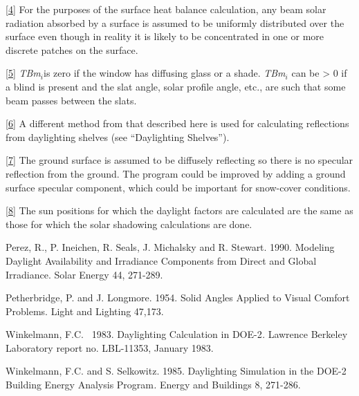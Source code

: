 \protect\hyperlink{ux5fftnref4}{{[}4{]}} For the purposes of the surface heat balance calculation, any beam solar radiation absorbed by a surface is assumed to be uniformly distributed over the surface even though in reality it is likely to be concentrated in one or more discrete patches on the surface.

\protect\hyperlink{ux5fftnref5}{{[}5{]}} \emph{TBm\(_{i}\)}is zero if the window has diffusing glass or a shade. \emph{TBm\(_{i}\)} can be \textgreater{} 0 if a blind is present and the slat angle, solar profile angle, etc., are such that some beam passes between the slats.

\protect\hyperlink{ux5fftnref6}{{[}6{]}} A different method from that described here is used for calculating reflections from daylighting shelves (see ``Daylighting Shelves'').

\protect\hyperlink{ux5fftnref7}{{[}7{]}} The ground surface is assumed to be diffusely reflecting so there is no specular reflection from the ground. The program could be improved by adding a ground surface specular component, which could be important for snow-cover conditions.

\protect\hyperlink{ux5fftnref8}{{[}8{]}} The sun positions for which the daylight factors are calculated are the same as those for which the solar shadowing calculations are done.

Perez, R., P. Ineichen, R. Seals, J. Michalsky and R. Stewart. 1990. Modeling Daylight Availability and Irradiance Components from Direct and Global Irradiance. Solar Energy 44, 271-289.

Petherbridge, P. and J. Longmore. 1954. Solid Angles Applied to Visual Comfort Problems. Light and Lighting 47,173.

Winkelmann, F.C.~ 1983. Daylighting Calculation in DOE-2\emph{.} Lawrence Berkeley Laboratory report no. LBL-11353, January 1983.

Winkelmann, F.C. and S. Selkowitz. 1985. Daylighting Simulation in the DOE-2 Building Energy Analysis Program\emph{.} Energy and Buildings 8, 271-286.
